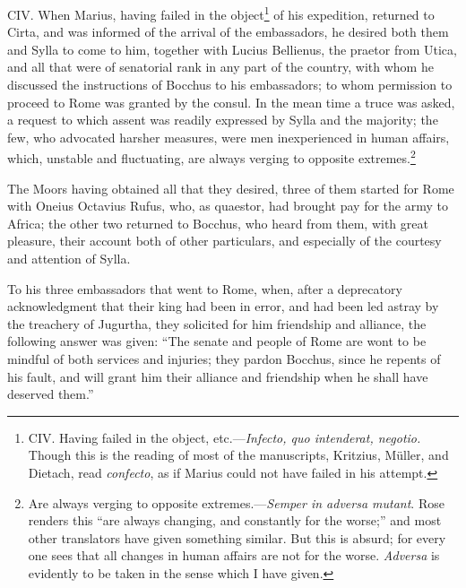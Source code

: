 CIV. When Marius, having failed in the object\footnote{CIV. Having failed in the object, etc.—\emph{Infecto, quo
intenderat, negotio.} Though this is the reading of most of the
manuscripts, Kritzius, Müller, and Dietach, read \emph{confecto}, as if
Marius could not have failed in his attempt.} of his expedition,
returned to Cirta, and was informed of the arrival of the embassadors,
he desired both them and Sylla to come to him, together with Lucius
Bellienus, the praetor from Utica, and all that were of senatorial rank
in any part of the country, with whom he discussed the instructions of
Bocchus to his embassadors; to whom permission to proceed to Rome was
granted by the consul. In the mean time a truce was asked, a request
to which assent was readily expressed by Sylla and the majority; the
few, who advocated harsher measures, were men inexperienced in human
affairs, which, unstable and fluctuating, are always verging to
opposite extremes.\footnote{Are always verging to opposite extremes.—\emph{Semper in adversa
mutant}. Rose renders this ``are always changing, and constantly for
the worse;'' and most other translators have given something similar.
But this is absurd; for every one sees that all changes in human
affairs are not for the worse. \emph{Adversa} is evidently to be taken in
the sense which I have given.}

The Moors having obtained all that they desired, three of them started
for Rome with Oneius Octavius Rufus, who, as quaestor, had brought pay
for the army to Africa; the other two returned to Bocchus, who heard
from them, with great pleasure, their account both of other
particulars, and especially of the courtesy and attention of Sylla.

To his three embassadors that went to Rome, when, after a deprecatory
acknowledgment that their king had been in error, and had been led
astray by the treachery of Jugurtha, they solicited for him friendship
and alliance, the following answer was given: ``The senate and people
of Rome are wont to be mindful of both services and injuries; they
pardon Bocchus, since he repents of his fault, and will grant him
their alliance and friendship when he shall have deserved them.''

